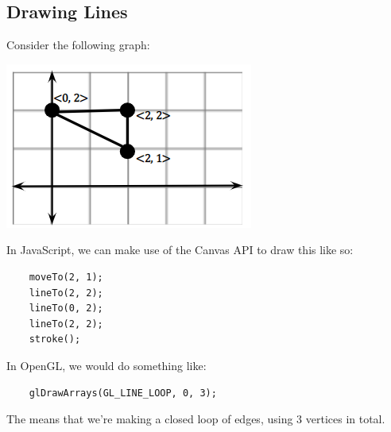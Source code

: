 \documentclass[letterpaper]{article}
\begin{document}
\subsection{Drawing Lines}
Consider the following graph:
\begin{center}
    \includegraphics[scale=1]{../assets/line1.png}
\end{center}
In JavaScript, we can make use of the Canvas API to draw this like so: 
\begin{verbatim}
    moveTo(2, 1);
    lineTo(2, 2);
    lineTo(0, 2);
    lineTo(2, 2);
    stroke();\end{verbatim}
In OpenGL, we would do something like: 
\begin{verbatim}
    glDrawArrays(GL_LINE_LOOP, 0, 3);\end{verbatim}
The  means that we're making a closed loop of edges, using 3 vertices in total. 

\bigskip 
\end{document}

